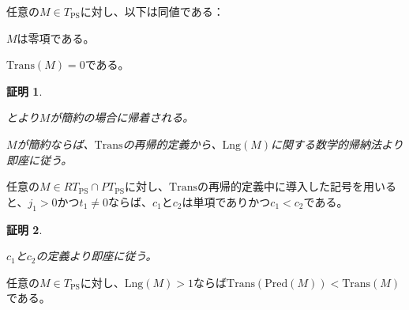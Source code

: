 \documentclass[dvipdfmx,uplatex]{jsarticle}
\theoremstyle{customnonumberbreakfortheorem}
\theoremstyle{customnonumberbreakforproof}
\newtheorem{hideableproof}{証明}
\begin{document}
\begin{proposition}\label{Transが零項性を保つこと}
	任意の\(M \in T_{\textrm{PS}}\)に対し、以下は同値である：
	\begin{penumerate}
		\item \(M\)は零項である。
		\item \(\textrm{Trans}(M) = 0\)である。
	\end{penumerate}
\end{proposition}

\begin{hideableproof}
	\begin{indented}
		\item {}とより\(M\)が簡約の場合に帰着される。
		\item \(M\)が簡約ならば、\(\textrm{Trans}\)の再帰的定義から、\(\textrm{Lng}(M)\)に関する数学的帰納法より即座に従う。
	\end{indented}
\end{hideableproof}

\begin{proposition}[\(c_1\)と\(c_2\)の大小関係]\label{c_1とc_2の大小関係}
	任意の\(M \in RT_{\textrm{PS}} \cap PT_{\textrm{PS}}\)に対し、\(\textrm{Trans}\)の再帰的定義中に導入した記号を用いると、\(j_1 > 0\)かつ\(t_1 \neq 0\)ならば、\(c_1\)と\(c_2\)は単項でありかつ\(c_1 < c_2\)である。
\end{proposition}

\begin{hideableproof}
	\begin{indented}
		\item \(c_1\)と\(c_2\)の定義より即座に従う。
	\end{indented}
\end{hideableproof}

\begin{proposition}\label{PredのTransに関する降下性}
	任意の\(M \in T_{\textrm{PS}}\)に対し、\(\textrm{Lng}(M) > 1\)ならば\(\textrm{Trans}(\textrm{Pred}(M)) < \textrm{Trans}(M)\)である。
\end{proposition}
\end{document}
